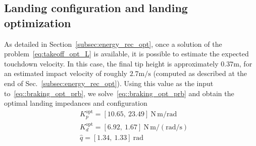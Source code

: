 \subsection{Landing configuration and landing optimization}\label{sec:land_conf}
As detailed in Section~\ref{subsec:energy_rec_opt}, once a solution of the problem~\eqref{eq:takeoff_opt_L} is available, it is possible to estimate the expected touchdown velocity. In this case, the final tip height is approximately $0.37\mathrm{m}$, for an estimated impact velocity of roughly $2.7\mathrm{m/s}$ (computed as described at the end of Sec.~\ref{subsec:energy_rec_opt}). Using this value as the input to~\eqref{eq::braking_opt_prb}, we solve~\eqref{eq::braking_opt_prb} and obtain the optimal landing impedances and configuration
\begin{align}
&K_p^{\mathrm{opt}} = \left[10.65,~23.49\right]~\mathrm{N\,m/rad}\label{eq:optimal_braking_sol}\\
&K_d^{\mathrm{opt}} = \left[6.92,~1.67\right]~\mathrm{N\,m/(rad/s)}\nonumber\\
&\hat{q} = \left[1.34,~1.33\right]~\mathrm{rad}\nonumber
\end{align}

